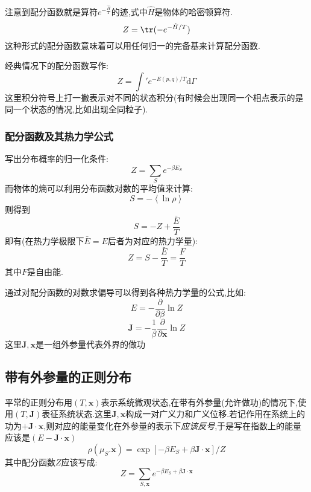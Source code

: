   注意到配分函数就是算符$e^{-\frac{\hat{H}}{T}}$的迹,式中$\hat{H}$是物体的哈密顿算符.
  \begin{equation}
    Z=\tr(-e^{- \hat{H} / T})
  \end{equation}
  这种形式的配分函数意味着可以用任何归一的完备基来计算配分函数.

  经典情况下的配分函数写作:
  \begin{equation}
    Z=\int' e^{-E(p,q) / T} \mathrm{d} \Gamma
  \end{equation}
  这里积分符号上打一撇表示对不同的状态积分(有时候会出现同一个相点表示的是同一个状态的情况,比如出现全同粒子).

\subsubsection{配分函数及其热力学公式}
  写出分布概率的归一化条件:
  \begin{equation}
    Z=\sum_S e^{-\beta E_S}
  \end{equation}
  而物体的熵可以利用分布函数对数的平均值来计算:
  \[S=-\left< \ln \rho \right> \]
  则得到
  \[S=-Z+\dfrac{\bar{E}}{T}\]
  即有(在热力学极限下$\bar{E}=E$后者为对应的热力学量):
  \begin{equation}
    Z=S-\dfrac{\bar{E}}{T}=\frac{F}{T}
  \end{equation}
  其中$F$是自由能.

  通过对配分函数的对数求偏导可以得到各种热力学量的公式,比如:
  \begin{equation}
    E=-\dfrac{\partial }{\partial \beta}\ln Z
  \end{equation}
  \begin{equation}
    \mathbf{J}=-\frac{1}{\beta}\dfrac{\partial }{\partial \mathbf{x}}\ln Z
  \end{equation}
  这里$\mathbf{J},\mathbf{x}$是一组外参量代表外界的做功

\subsection{带有外参量的正则分布}
  平常的正则分布用$(T,\mathbf{x})$表示系统微观状态,在带有外参量(允许做功)的情况下,使用$(T,\mathbf{J})$表征系统状态.这里$\mathbf{J},\mathbf{x}$构成一对广义力和广义位移.若记作用在系统上的功为$+\mathbf{J}\cdot \mathbf{x}$,则对应的能量变化在外参量的表示下\emph{应该反号},于是写在指数上的能量应该是$(E-\mathbf{J}\cdot \mathbf{x})$
  \[\rho(\mu_S.\mathbf{x})=\exp[-\beta E_S+\beta \mathbf{J}\cdot \mathbf{x}] / Z\]
  其中配分函数$Z$应该写成:
  \begin{equation}
    Z=\sum_{S,\mathbf{x}}e^{-\beta E_S+\beta \mathbf{J}\cdot \mathbf{x}}
  \end{equation}

